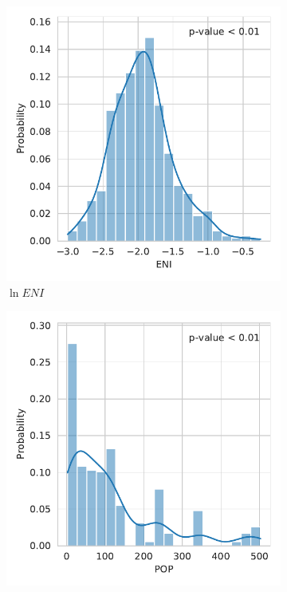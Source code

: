 \documentclass[12pt,a4paper]{article}
\begin{document}
\begin{figure}[htbp]
\begin{subfigure}{0.45\textwidth}
\includegraphics[width=\textwidth]{./plots/dis/distplot_lnENI.pdf}
\caption{$\ln ENI$}
\end{subfigure}
\begin{subfigure}{0.45\textwidth}
\includegraphics[width=\textwidth]{./plots/dis/distplot_POP.pdf}

\end{subfigure}
\end{figure}
\end{document}
